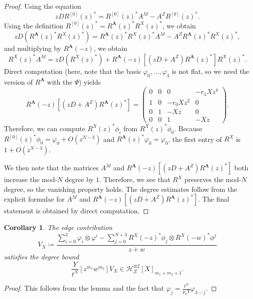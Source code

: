 \documentclass[10pt]{amsart}
\newtheorem{cor}[thm]{Corollary}
\theoremstyle{definition}
\theoremstyle{remark}
\theoremstyle{plain}
\theoremstyle{definition}
\theoremstyle{remark}
\newcommand{\bA}{\mathbf{A}}
\newcommand{\msc}[1]{\mathscr{#1}}
\newcommand{\1}{\mathbf{1}}
\newcommand{\2}{\mathbf{2}}
\newcommand{\3}{\mathbf{3}}
\numberwithin{equation}{section}
\begin{document}
\begin{proof}
    Using the equation
    \begin{equation}\label{eqn:mspqde}
     zD R^{[0]}(z)^* = R^{[0]}(z)^* A^M - A^Z R^{[0]}(z)^* . 
    \end{equation}
    Using the definition $R^{[0]}(z)^* = R^{\bA}(z)^* R^X(z)^*$, we obtain
    \[ zD(R^{\bA}(z)^*R^X(z)^*) = R^{\bA}(z)^* R^X(z)^* A^M - A^Z R^{\bA}(z)^* R^X(z)^*, \]
    and multiplying by $R^{\bA}(-z)$, we obtain
    \begin{equation}\label{eqn:Xqde}
    R^X(z)^* A^M = zD(R^X(z)^*) + R^{\bA}(-z) [(zD+A^Z) R^{\bA}(z)^*] R^X(z)^*. 
    \end{equation}
    Direct computation (here, note that the basis $\varphi_0, \ldots, \varphi_3$ is not flat, so we need the version of $R^{\bA}$ with the $\Psi$) yields
    \[ R^{\bA}(-z) [(zD+A^Z)R^{\bA}(z)^*] = \begin{pmatrix}
        0 & 0 & 0 & -r_1 X z^4 \\
        1 & 0 & -r_0 X z^2 & 0 \\
        0 & 1 & -Xz & 0 \\
        0 & 0 & 1 & -Xz
    \end{pmatrix}.
     \]
     Therefore, we can compute $R^X(z)^* \phi_i$ from $R^X(z)^* \phi_0$. Because $R^{[0]}(z)^* \phi_0 = \varphi_0 + O(z^{N-3})$ and $R^{\bA}(z)^* \varphi_0 = \varphi_0$, the first entry of $R^X$ is $1 + O(z^{N-3})$.

     We then note that the matrices $A^M$ and $R^{\bA}(-z)[(zD+A^Z)R^{\bA}(z)^*]$ both increase the mod-$N$ degree by $1$. Therefore, we see that $R^{X}$ preserves the mod-$N$ degree, so the vanishing property holds. The degree estimates follow from the explicit formulae for $A^M$ and $R^{\bA}(-z) [(zD+A^Z)R^{\bA}(z)^*]$. The final statement is obtained by direct computation.
\end{proof}

\begin{cor}\label{cor:edgeX}
    The edge contribution
    \[ V_X \coloneqq \frac{\sum_{i=0}^3 \varphi_i \otimes \varphi^i - \sum_{j=0}^{N+3} R^X(-z)^* \phi_j \otimes R^X(-w)^* \phi^j}{z+w} \]
    satisfies the degree bound
    \[ \frac{Y}{t^N} [z^{m_1} w^{m_2}] V_X \in \msc{H}_Z^{\otimes 2}[X]_{m_1+m_2+1}. \]
\end{cor}

\begin{proof}
    This follows from the lemma and the fact that $\varphi_j = \frac{t^N}{p_k Y} \varphi_{3-j}$.
\end{proof}
\end{document}
